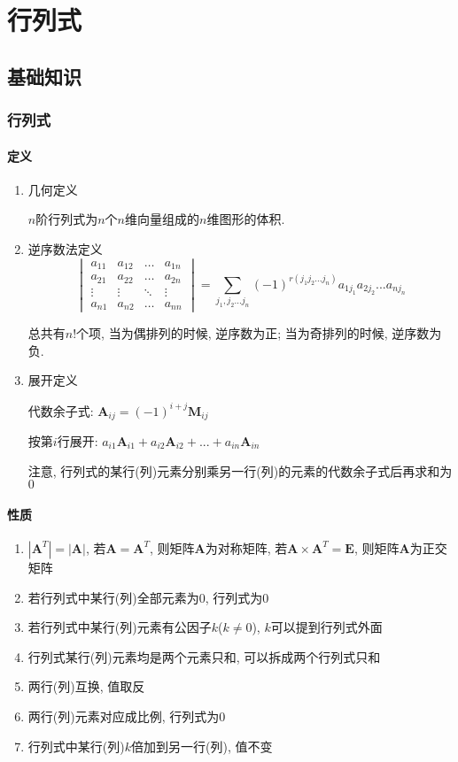 \chapter{行列式}
\section{基础知识}
\subsection{行列式}
\subsubsection{定义}
\begin{enumerate}
\item 几何定义\par $ n $阶行列式为$ n $个$ n $维向量组成的$ n $维图形的体积.
\item 逆序数法定义
\begin{equation*}
\begin{vmatrix}
a_{11}	&a_{12}  &\dots  &a_{1n}  \\
a_{21}	&a_{22}  &\dots  &a_{2n}  \\
\vdots	&\vdots  &\ddots  &\vdots  \\
a_{n1}	&a_{n2}  &\dots  &a_{nn}
\end{vmatrix}  = \sum_{j_{1},j_{2}...j_{n}}(-1)^{r(j_{1}j_{2}...j_{n})}a_{1j_{1}}a_{2j_{2}}...a_{nj_{n}}
\end{equation*}\par
总共有$ n! $个项, 当为偶排列的时候, 逆序数为正; 当为奇排列的时候, 逆序数为负.
\item 展开定义\par 代数余子式: $ \bm{A}_{ij}=(-1)^{i+j}\bm{M}_{ij} $\par 按第$ i $行展开: $ a_{i1}\bm{A}_{i1}+a_{i2}\bm{A}_{i2}+...+a_{in}\bm{A}_{in} $\par 注意, 行列式的某行(列)元素分别乘另一行(列)的元素的代数余子式后再求和为$ 0 $
\end{enumerate}
\subsubsection{性质}
\begin{enumerate}
\item $ |\bm{A}^{T}|=|\bm{A}| $, 若$ \bm{A} = \bm{A}^{T} $, 则矩阵$ \bm{A} $为对称矩阵, 若$ \bm{A} \times \bm{A}^{T} = \bm{E} $, 则矩阵$ \bm{A} $为正交矩阵
\item 若行列式中某行(列)全部元素为$ 0 $, 行列式为$ 0 $
\item 若行列式中某行(列)元素有公因子$ k $($ k\neq 0 $), $ k $可以提到行列式外面
\item 行列式某行(列)元素均是两个元素只和, 可以拆成两个行列式只和
\item 两行(列)互换, 值取反
\item 两行(列)元素对应成比例, 行列式为$ 0 $
\item 行列式中某行(列)$ k $倍加到另一行(列), 值不变
\end{enumerate}
